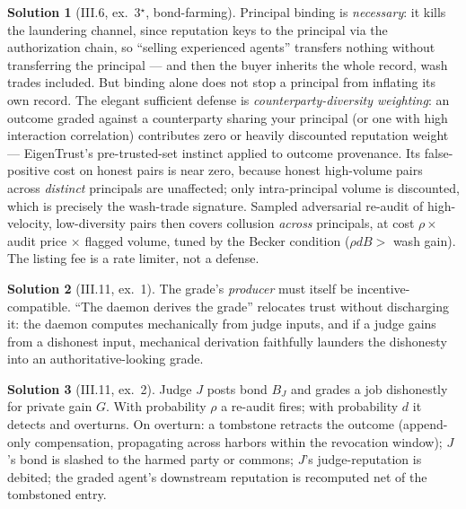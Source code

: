 \documentclass[11pt,a4paper]{article}
\theoremstyle{definition}
\newtheorem{sol}{Solution}
\theoremstyle{remark}
\begin{document}
\begin{sol}[III.6, ex.\ 3$^\star$, bond-farming]
Principal binding is \emph{necessary}: it kills the laundering channel, since reputation keys to the principal via the authorization chain, so ``selling experienced agents'' transfers nothing without transferring the principal --- and then the buyer inherits the whole record, wash trades included. But binding alone does not stop a principal from inflating its own record. The elegant sufficient defense is \emph{counterparty-diversity weighting}: an outcome graded against a counterparty sharing your principal (or one with high interaction correlation) contributes zero or heavily discounted reputation weight --- EigenTrust's pre-trusted-set instinct applied to outcome provenance. Its false-positive cost on honest pairs is near zero, because honest high-volume pairs across \emph{distinct} principals are unaffected; only intra-principal volume is discounted, which is precisely the wash-trade signature. Sampled adversarial re-audit of high-velocity, low-diversity pairs then covers collusion \emph{across} principals, at cost $\rho \times$ audit price $\times$ flagged volume, tuned by the Becker condition ($\rho d B > $ wash gain). The listing fee is a rate limiter, not a defense.
\end{sol}

\begin{sol}[III.11, ex.\ 1]
The grade's \emph{producer} must itself be incentive-compatible. ``The daemon derives the grade'' relocates trust without discharging it: the daemon computes mechanically from judge inputs, and if a judge gains from a dishonest input, mechanical derivation faithfully launders the dishonesty into an authoritative-looking grade.
\end{sol}

\begin{sol}[III.11, ex.\ 2]
Judge $J$ posts bond $B_J$ and grades a job dishonestly for private gain $G$. With probability $\rho$ a re-audit fires; with probability $d$ it detects and overturns. On overturn: a tombstone retracts the outcome (append-only compensation, propagating across harbors within the revocation window); $J$'s bond is slashed to the harmed party or commons; $J$'s judge-reputation is debited; the graded agent's downstream reputation is recomputed net of the tombstoned entry.
\end{sol}
\end{document}
